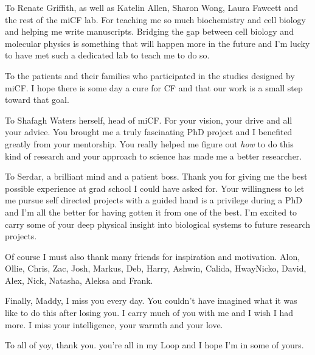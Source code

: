 To Renate Griffith, as well as Katelin Allen, Sharon Wong, Laura Fawcett and the rest of the miCF lab. For teaching me so much biochemistry and cell biology and helping me write manuscripts. Bridging the gap between cell biology and molecular physics is something that will happen more in the future and I'm lucky to have met such a dedicated lab to teach me to do so.

To the patients and their families who participated in the studies designed by miCF. I hope there is some day a cure for CF and that our work is a small step toward that goal.

To Shafagh Waters herself, head of miCF. For your vision, your drive and all your advice. You brought me a truly fascinating PhD project and I benefited greatly from your mentorship. You really helped me figure out \textit{how} to do this kind of research and your approach to science has made me a better researcher.

To Serdar, a brilliant mind and a patient boss. Thank you for giving me the best possible experience at grad school I could have asked for. Your willingness to let me pursue self directed projects with a guided hand is a privilege during a PhD and I'm all the better for having gotten it from one of the best. I'm excited to carry some of your deep physical insight into biological systems to future research projects. 

Of course I must also thank many friends for inspiration and motivation. Alon, Ollie, Chris, Zac, Josh, Markus, Deb, Harry, Ashwin, Calida, HwayNicko, David, Alex, Nick, Natasha, Aleksa and Frank.

Finally, Maddy, I miss you every day. You couldn't have imagined what it was like to do this after losing you. I carry much of you with me and I wish I had more. I miss your intelligence, your warmth and your love.

To all of yoy, thank you. you're all in my Loop\cite{hofstadter2007} and I hope I'm in some of yours.

